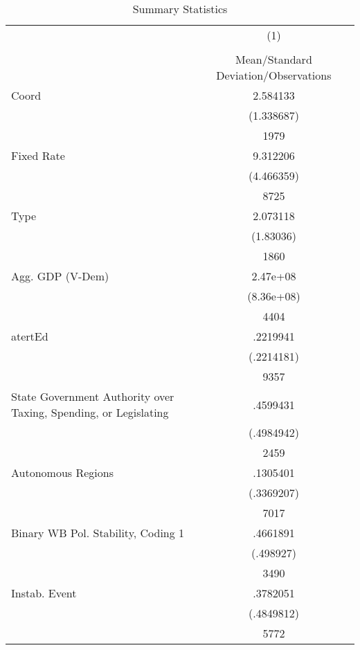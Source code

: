 {
\def\sym#1{\ifmmode^{#1}\else\(^{#1}\)\fi}
\begin{longtable}{l*{1}{c}}
\caption{Summary Statistics \label{sumstatsAll}}\\
\hline\hline\endfirsthead\hline\endhead\hline\endfoot\endlastfoot
                    &\multicolumn{1}{c}{(1)}\\
                    &\multicolumn{1}{c}{}\\
                    &Mean/Standard Deviation/Observations\\
\hline
Coord               &    2.584133\\
                    &  (1.338687)\\
                    &        1979\\
Fixed Rate          &    9.312206\\
                    &  (4.466359)\\
                    &        8725\\
Type                &    2.073118\\
                    &   (1.83036)\\
                    &        1860\\
Agg. GDP (V-Dem)    &    2.47e+08\\
                    &  (8.36e+08)\\
                    &        4404\\
atertEd             &    .2219941\\
                    &  (.2214181)\\
                    &        9357\\
State Government Authority over Taxing, Spending, or Legislating&    .4599431\\
                    &  (.4984942)\\
                    &        2459\\
Autonomous Regions  &    .1305401\\
                    &  (.3369207)\\
                    &        7017\\
Binary WB Pol. Stability, Coding 1&    .4661891\\
                    &   (.498927)\\
                    &        3490\\
Instab. Event       &    .3782051\\
                    &  (.4849812)\\
                    &        5772\\

\end{longtable}}
